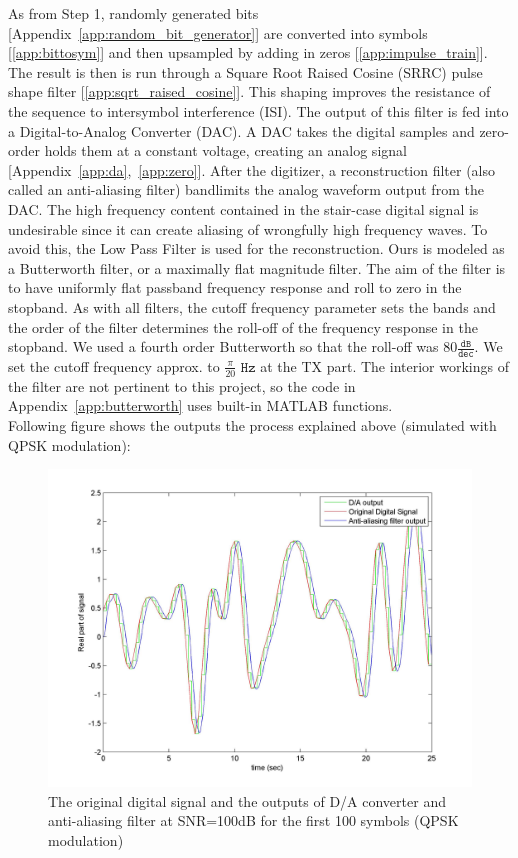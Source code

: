 \documentclass[]{article}
\begin{document}
As from Step 1, randomly generated bits [Appendix~\ref{app:random_bit_generator}] are converted into symbols [\ref{app:bittosym}] and then upsampled by adding in zeros [\ref{app:impulse_train}].  The result is then is run through a Square Root Raised Cosine (SRRC) pulse shape filter [\ref{app:sqrt_raised_cosine}].  This shaping improves the resistance of the sequence to intersymbol interference (ISI).  The output of this filter is fed into a Digital-to-Analog Converter (DAC).  A DAC takes the digital samples and zero-order holds them at a constant voltage, creating an analog signal [Appendix~\ref{app:da},~\ref{app:zero}]. After the digitizer, a reconstruction filter (also called an anti-aliasing filter) bandlimits the analog waveform output from the DAC.  The high frequency content contained in the stair-case digital signal is undesirable since it can create aliasing of wrongfully high frequency waves. To avoid this, the Low Pass Filter is used for the reconstruction.  Ours is modeled as a Butterworth filter, or a maximally flat magnitude filter.  The aim of the filter is to have uniformly flat passband frequency response and roll to zero in the stopband.  As with all filters, the cutoff frequency parameter sets the bands and the order of the filter determines the roll-off of the frequency response in the stopband.  We used a fourth order Butterworth so that the roll-off was $80 \mathtt{\frac{dB}{dec}}$.  We set the cutoff frequency approx. to $\frac{\pi}{20}$ $\mathtt{Hz}$ at the TX part. The interior workings of the filter are not pertinent to this project, so the code in Appendix~\ref{app:butterworth} uses built-in MATLAB functions.  \\

\newpage
Following figure shows the outputs the process explained above (simulated with QPSK modulation):

\begin{figure}[H]
\centering
\includegraphics[width=\textwidth]{DtoA.jpg}
\caption{The original digital signal and the outputs of D/A converter and anti-aliasing filter at SNR=100dB for the first 100 symbols (QPSK modulation)\label{fig:dtoa}}
\end{figure}
\end{document}

